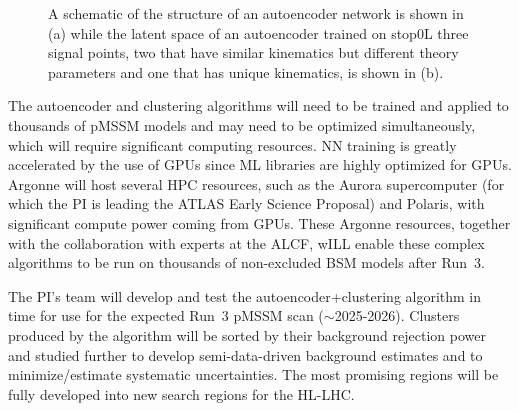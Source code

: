 \documentclass[letter, USenglish, 11pt, subfigure]{article}
\begin{document}
\begin{figure}[!htbp]
  \centering
  \hspace{3mm}
  \caption{A schematic of the structure of an autoencoder network is shown in (a) while the latent space of an autoencoder trained on stop0L three signal points, two that have similar kinematics but different theory parameters and one that has unique kinematics, is shown in (b).}
  \label{fig:autoencoderDimRed}
\end{figure}


The autoencoder and clustering algorithms will need to be trained and applied to thousands of pMSSM models and may need to be optimized simultaneously, which will require significant computing resources. NN training is greatly accelerated by the use of GPUs since ML libraries are highly optimized for GPUs. Argonne will host several HPC resources, such as the Aurora supercomputer (for which the PI is leading the ATLAS Early Science Proposal) and Polaris, with significant compute power coming from GPUs. These Argonne resources, together with the collaboration with experts at the ALCF, wILL enable these complex algorithms to be run on thousands of non-excluded BSM models after Run~3. 

The PI's team will develop and test the autoencoder+clustering algorithm in time for use for the expected Run~3 pMSSM scan ($\sim$2025-2026). Clusters produced by the algorithm will be sorted by their background rejection power and studied further to develop semi-data-driven background estimates and to minimize/estimate systematic uncertainties. The most promising regions will be fully developed into new search regions for the HL-LHC.

\FloatBarrier
\end{document}
